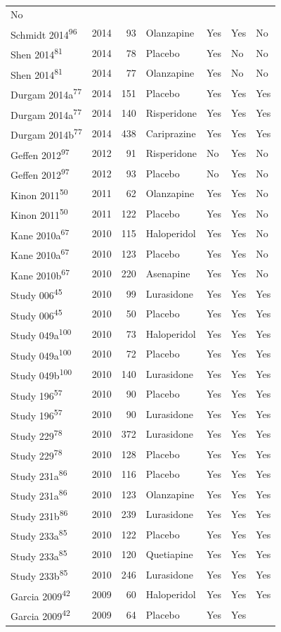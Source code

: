 \documentclass[9pt,english,,jou,floatsintext]{apa6}
\begin{document}
\begin{longtable}[]{@{}lrrllll@{}}
No\tabularnewline
Schmidt 2014\textsuperscript{96} & 2014 & 93 & Olanzapine & Yes & Yes &
No\tabularnewline
Shen 2014\textsuperscript{81} & 2014 & 78 & Placebo & Yes & No &
No\tabularnewline
Shen 2014\textsuperscript{81} & 2014 & 77 & Olanzapine & Yes & No &
No\tabularnewline
Durgam 2014a\textsuperscript{77} & 2014 & 151 & Placebo & Yes & Yes &
Yes\tabularnewline
Durgam 2014a\textsuperscript{77} & 2014 & 140 & Risperidone & Yes & Yes
& Yes\tabularnewline
Durgam 2014b\textsuperscript{77} & 2014 & 438 & Cariprazine & Yes & Yes
& Yes\tabularnewline
Geffen 2012\textsuperscript{97} & 2012 & 91 & Risperidone & No & Yes &
No\tabularnewline
Geffen 2012\textsuperscript{97} & 2012 & 93 & Placebo & No & Yes &
No\tabularnewline
Kinon 2011\textsuperscript{50} & 2011 & 62 & Olanzapine & Yes & Yes &
No\tabularnewline
Kinon 2011\textsuperscript{50} & 2011 & 122 & Placebo & Yes & Yes &
No\tabularnewline
Kane 2010a\textsuperscript{67} & 2010 & 115 & Haloperidol & Yes & Yes &
No\tabularnewline
Kane 2010a\textsuperscript{67} & 2010 & 123 & Placebo & Yes & Yes &
No\tabularnewline
Kane 2010b\textsuperscript{67} & 2010 & 220 & Asenapine & Yes & Yes &
No\tabularnewline
Study 006\textsuperscript{45} & 2010 & 99 & Lurasidone & Yes & Yes &
Yes\tabularnewline
Study 006\textsuperscript{45} & 2010 & 50 & Placebo & Yes & Yes &
Yes\tabularnewline
Study 049a\textsuperscript{100} & 2010 & 73 & Haloperidol & Yes & Yes &
Yes\tabularnewline
Study 049a\textsuperscript{100} & 2010 & 72 & Placebo & Yes & Yes &
Yes\tabularnewline
Study 049b\textsuperscript{100} & 2010 & 140 & Lurasidone & Yes & Yes &
Yes\tabularnewline
Study 196\textsuperscript{57} & 2010 & 90 & Placebo & Yes & Yes &
Yes\tabularnewline
Study 196\textsuperscript{57} & 2010 & 90 & Lurasidone & Yes & Yes &
Yes\tabularnewline
Study 229\textsuperscript{78} & 2010 & 372 & Lurasidone & Yes & Yes &
Yes\tabularnewline
Study 229\textsuperscript{78} & 2010 & 128 & Placebo & Yes & Yes &
Yes\tabularnewline
Study 231a\textsuperscript{86} & 2010 & 116 & Placebo & Yes & Yes &
Yes\tabularnewline
Study 231a\textsuperscript{86} & 2010 & 123 & Olanzapine & Yes & Yes &
Yes\tabularnewline
Study 231b\textsuperscript{86} & 2010 & 239 & Lurasidone & Yes & Yes &
Yes\tabularnewline
Study 233a\textsuperscript{85} & 2010 & 122 & Placebo & Yes & Yes &
Yes\tabularnewline
Study 233a\textsuperscript{85} & 2010 & 120 & Quetiapine & Yes & Yes &
Yes\tabularnewline
Study 233b\textsuperscript{85} & 2010 & 246 & Lurasidone & Yes & Yes &
Yes\tabularnewline
Garcia 2009\textsuperscript{42} & 2009 & 60 & Haloperidol & Yes & Yes &
Yes\tabularnewline
Garcia 2009\textsuperscript{42} & 2009 & 64 & Placebo & Yes & Yes &

\end{longtable}
\end{document}
